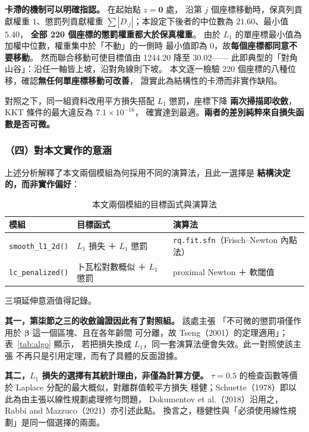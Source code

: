 \documentclass[UTF8, fontset=macnew, a4paper, 12pt]{ctexart}
\begin{document}
\textbf{卡滯的機制可以明確指認。} 在起始點 $z=\mathbf{0}$ 處，
沿第 $j$ 個座標移動時，保真列貢獻權重 $1$、懲罰列貢獻權重
$\sum|D_{\cdot j}|$；本設定下後者的中位數為 $21.60$、最小值 $5.40$，
\textbf{全部 220 個座標的懲罰權重都大於保真權重}。
由於 $L_1$ 的單座標最小值為加權中位數，權重集中於「不動」的一側時
最小值即為 $0$，故\textbf{每個座標都同意不要移動}。
然而聯合移動可使目標值由 1244.20 降至 30.02——
此即典型的「對角山谷」：沿任一軸皆上坡，沿對角線則下坡。
本文逐一檢驗 220 個座標的八種位移，確認\textbf{無任何單座標移動可改善}，
證實此為結構性的卡滯而非實作缺陷。

對照之下，同一組資料改用平方損失搭配 $L_1$ 懲罰，座標下降
\textbf{兩次掃描即收斂}，KKT 條件的最大違反為 $7.1\times10^{-16}$，
確實達到最適。\textbf{兩者的差別純粹來自損失函數是否可微。}

\subsubsection{（四）對本文實作的意涵}

上述分析解釋了本文兩個模組為何採用不同的演算法，且此一選擇是
\textbf{結構決定的，而非實作偏好}：

\begin{table}[H]
\centering
\caption{本文兩個模組的目標函式與演算法}
\small
\begin{tabular}{lll}
\toprule
模組 & 目標函式 & 演算法\\
\midrule
\texttt{smooth\_l1\_2d()} & $L_1$ 損失 ＋ $L_1$ 懲罰 &
  \texttt{rq.fit.sfn}（Frisch--Newton 內點法）\\
\texttt{lc\_penalized()} & 卜瓦松對數概似 ＋ $L_1$ 懲罰 &
  proximal Newton ＋ 軟閾值\\
\bottomrule
\end{tabular}
\label{tab:modules}
\end{table}

三項延伸意涵值得記錄。

\textbf{其一，第柒節之三的收斂論證因此有了對照組。} 該處主張
「不可微的懲罰項僅作用於 $\boldsymbol{\beta}$ 這一個區塊、且在各年齡間
可分離，故 Tseng（2001）的定理適用」；表~\ref{tab:algo} 顯示，
若把損失換成 $L_1$，同一套演算法便會失效。此一對照使該主張
不再只是引用定理，而有了具體的反面證據。

\textbf{其二，$L_1$ 損失的選擇有其統計理由，非僅為計算方便。}
$\tau=0.5$ 的檢查函數等價於 Laplace 分配的最大概似，對離群值較平方損失
穩健；Schuette（1978）即以此為由主張以線性規劃處理修勻問題，
Dokumentov et al.（2018）沿用之，Rabbi and Mazzuco（2021）亦引述此點。
換言之，穩健性與「必須使用線性規劃」是同一個選擇的兩面。
\end{document}
